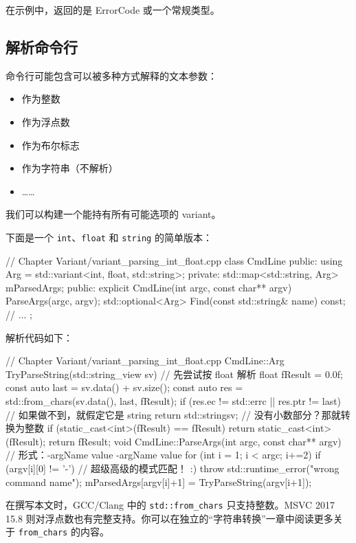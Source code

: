 在示例中，返回的是 ErrorCode 或一个常规类型。

\subsection{解析命令行}

命令行可能包含可以被多种方式解释的文本参数：

\begin{itemize}
\item 作为整数
\item 作为浮点数
\item 作为布尔标志
\item 作为字符串（不解析）
\item ……
\end{itemize}

我们可以构建一个能持有所有可能选项的 variant。

下面是一个 \texttt{int}、\texttt{float} 和 \texttt{string} 的简单版本：

\begin{codebox}[cpp]
// Chapter Variant/variant_parsing_int_float.cpp
class CmdLine
{
public:
using Arg = std::variant<int, float, std::string>;
private:
std::map<std::string, Arg> mParsedArgs;
public:
explicit CmdLine(int argc, const char** argv) { ParseArgs(argc, argv); }
std::optional<Arg> Find(const std::string& name) const;
// ...
};
\end{codebox}

解析代码如下：

\begin{codebox}[cpp]
// Chapter Variant/variant_parsing_int_float.cpp
CmdLine::Arg TryParseString(std::string_view sv)
{
// 先尝试按 float 解析
float fResult = 0.0f;
const auto last = sv.data() + sv.size();
const auto res = std::from_chars(sv.data(), last, fResult);
if (res.ec != std::errc{} || res.ptr != last)
{
// 如果做不到，就假定它是 string
return std::string{sv};
}
// 没有小数部分？那就转换为整数
if (static_cast<int>(fResult) == fResult)
return static_cast<int>(fResult);
return fResult;
}
void CmdLine::ParseArgs(int argc, const char** argv)
{
// 形式：-argName value -argName value
for (int i = 1; i < argc; i+=2)
{
if (argv[i][0] != '-') // 超级高级的模式匹配！ :)
throw std::runtime_error("wrong command name");
mParsedArgs[argv[i]+1] = TryParseString(argv[i+1]);
}
}
\end{codebox}

在撰写本文时，GCC/Clang 中的 \texttt{std::from\_chars} 只支持整数。MSVC 2017 15.8 则对浮点数也有完整支持。你可以在独立的“字符串转换”一章中阅读更多关于 \texttt{from\_chars} 的内容。

